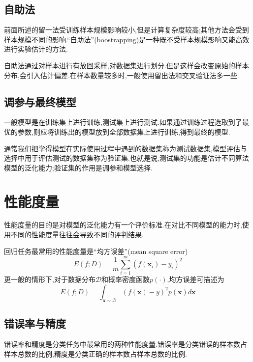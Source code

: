 \subsection{自助法}

前面所述的留一法受训练样本规模影响较小,但是计算复杂度较高;其他方法会受到样本规模不同的影响.``自助法''(boostrapping)是一种既不受样本规模影响又能高效进行实验估计的方法.

自助法通过对样本进行有放回采样,对数据集进行划分.但是这样会改变原始的样本分布,会引入估计偏差.在样本数量较多时,一般使用留出法和交叉验证法多一些.

\subsection{调参与最终模型}

一般模型是在训练集上进行训练,测试集上进行测试.如果通过训练过程选取到了最优的参数,则应将训练出的模型放到全部数据集上进行训练,得到最终的模型.

通常我们把学得模型在实际使用过程中遇到的数据集称为测试数据集,模型评估与选择中用于评估测试的数据集称为验证集.也就是说,测试集的功能是估计不同算法模型的泛化能力;验证集的作用是调参和模型选择.

\section{性能度量}

性能度量的目的是对模型的泛化能力有一个评价标准.在对比不同模型的能力时,使用不同的性能度量往往会导致不同的评判结果.

回归任务最常用的性能度量是``均方误差''(mean square error)
\begin{equation}E(f;D)=\frac{1}{m}\sum_{i=1}^m(f(\mathbf x_i)-y_i)^2\end{equation}
更一般的情形下,对于数据分布$\mathcal D$和概率密度函数$p(\cdot)$,均方误差可描述为
\begin{equation}E(f;D)=\int_{\mathbf x\sim\mathcal D}(f(\mathbf x)-y)^2p(\mathbf x)d\mathbf x\end{equation}

\subsection{错误率与精度}

错误率和精度是分类任务中最常用的两种性能度量.错误率是分类错误的样本数占样本总数的比例,精度是分类正确的样本数占样本总数的比例.

